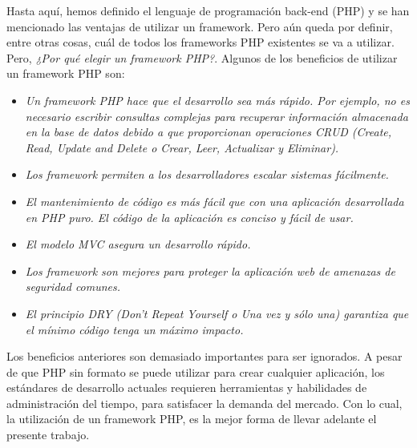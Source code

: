 \documentclass[11pt,oneside]{book}
\begin{document}
Hasta aquí, hemos definido el lenguaje de programación back-end (PHP) y se han mencionado las ventajas de utilizar un framework. Pero aún queda por definir, entre otras cosas, cuál de todos los frameworks PHP existentes se va a utilizar. Pero, \textit{¿Por qué elegir un framework PHP?}. Algunos de los beneficios de utilizar un framework PHP son:
\begin{itemize}
\item \textit{Un framework PHP hace que el desarrollo sea más rápido. Por ejemplo, no es necesario escribir consultas complejas para recuperar información almacenada en la base de datos debido a que proporcionan operaciones CRUD (Create, Read, Update and Delete o Crear, Leer, Actualizar y Eliminar).}
\item \textit{Los framework permiten a los desarrolladores escalar sistemas fácilmente.}
\item \textit{El mantenimiento de código es más fácil que con una aplicación desarrollada en PHP puro. El código de la aplicación es conciso y fácil de usar.}
\item \textit{El modelo MVC asegura un desarrollo rápido.}
\item \textit{Los framework son mejores para proteger la aplicación web de amenazas de seguridad comunes.}
\item \textit{El principio DRY (Don't Repeat Yourself o Una vez y sólo una) garantiza que el mínimo código tenga un máximo impacto.}
\end{itemize}

Los beneficios anteriores son demasiado importantes para ser ignorados. A pesar de que PHP sin formato se puede utilizar para crear cualquier aplicación, los estándares de desarrollo actuales requieren herramientas y habilidades de administración del tiempo, para satisfacer la demanda del mercado. Con lo cual, la utilización de un framework PHP, es la mejor forma de llevar adelante el presente trabajo.
\end{document}
